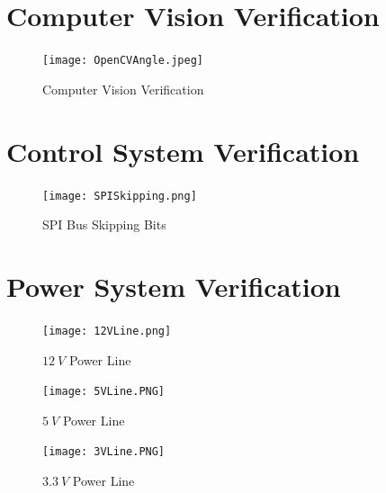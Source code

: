 \documentclass{report}
\begin{document}
    \newpage

    \section{Computer Vision Verification}

    \begin{figure}[ht!]
      \begin{center}
          \texttt{[image: OpenCVAngle.jpeg]}\\
          \caption{ Computer Vision Verification } 
          \label{fig:CVVerification}
      \end{center}  
    \end{figure}

    \newpage

    \section{Control System Verification}

    \begin{figure}[ht!]
      \begin{center}
          \texttt{[image: SPISkipping.png]}\\
          \caption{ SPI Bus Skipping Bits } 
          \label{fig:SPISkipping}
      \end{center}  
    \end{figure}

    \newpage

    \section{Power System Verification}

    \begin{figure}[ht!]
      \centering
      \begin{minipage}[b]{0.3\linewidth}
        \centering
        \texttt{[image: 12VLine.png]}
        \caption{$12~V$ Power Line}
        \label{fig:12V}
      \end{minipage}
      \hfill
      \begin{minipage}[b]{0.3\linewidth}
        \centering
        \texttt{[image: 5VLine.PNG]}
        \caption{$5~V$ Power Line}
        \label{fig:5V}
      \end{minipage}
      \hfill
      \begin{minipage}[b]{0.3\linewidth}
        \centering
        \texttt{[image: 3VLine.PNG]}
        \caption{$3.3~V$ Power Line}
        \label{fig:3V}
      \end{minipage}
    \end{figure}
\end{document}
